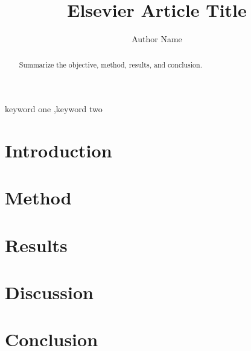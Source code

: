 \documentclass[preprint,12pt]{elsarticle}
\begin{document}
\begin{frontmatter}
\title{Elsevier Article Title}
\author[inst1]{Author Name}

\begin{abstract}
Summarize the objective, method, results, and conclusion.
\end{abstract}

\begin{keyword}
keyword one \sep keyword two
\end{keyword}
\end{frontmatter}

\section{Introduction}
\section{Method}
\section{Results}
\section{Discussion}
\section{Conclusion}

% 
% 
\end{document}
